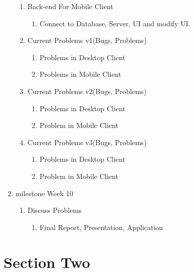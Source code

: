 \documentclass{article}
\begin{document}
\begin{enumerate}[Level 1:]
\begin{enumerate}[1]
			\item Back-end For Mobile Client
			\begin{enumerate}[a]
				\item Connect to Database, Server, UI and modify UI.
			\end{enumerate}
			
			\item Current Problems v1(Bugs, Problems)
			\begin{enumerate}[a]
				\item Problems in Desktop Client
				\item Problems in Mobile Client
			\end{enumerate}
			
			\item Current Problems v2(Bugs, Problems)
			\begin{enumerate}[a]
				\item Problems in Desktop Client
				\item Problem in Mobile Client
			\end{enumerate}
			
			\item Current Problems v3(Bugs, Problems)
			\begin{enumerate}[a]
				\item Problems in Desktop Client
				\item Problem in Mobile Client
			\end{enumerate}
		\end{enumerate}
	
		\item milestone Week 10
		
		\begin{enumerate}[1]
			\item Discuss Problems
			\begin{enumerate}[a]
				\item Final Report, Presentation, Application
			\end{enumerate}
		
		\end{enumerate}
	
	\end{enumerate}

	\section{Section Two}
	
\end{document}
